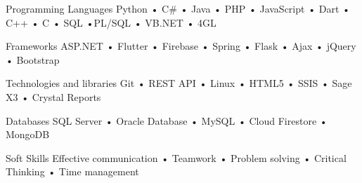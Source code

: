 

\begin{cvskills}
  \cvskill
    {Programming Languages} %
    {Python • C\# • Java • PHP • JavaScript • Dart • C++ • C • SQL •PL/SQL • VB.NET • 4GL} %

\end{cvskills}


\begin{cvskills}
  \cvskill
    {Frameworks} %
    {ASP.NET • Flutter • Firebase • Spring • Flask • Ajax • jQuery •  Bootstrap} %
\end{cvskills}


\begin{cvskills}
  \cvskill
    {Technologies and libraries} %
    {Git • REST API • Linux • HTML5 • SSIS • Sage X3 • Crystal Reports} %
\end{cvskills}


\begin{cvskills}
  \cvskill
    {Databases} %
    {SQL Server • Oracle Database • MySQL • Cloud Firestore • MongoDB} %
\end{cvskills}


\begin{cvskills}
  \cvskill
    {Soft Skills} %
    {Effective communication • Teamwork • Problem solving • Critical Thinking • Time management} %
\end{cvskills}
